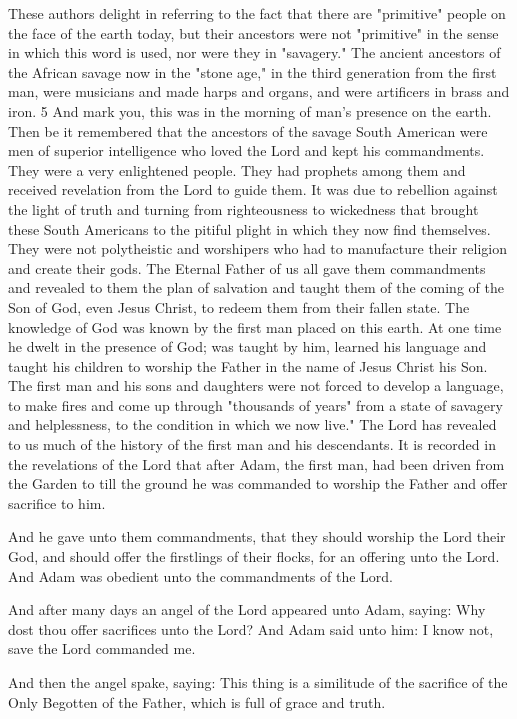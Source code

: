 These authors delight in referring to the fact that there are "primitive" people on the face of
the earth today, but their ancestors were not "primitive" in the sense in which this word is
used, nor were they in "savagery." The ancient ancestors of the African savage now in the
"stone age," in the third generation from the first man, were musicians and made harps and
organs, and were artificers in brass and iron. 5 And mark you, this was in the morning of
man's presence on the earth. Then be it remembered that the ancestors of the savage South
American were men of superior intelligence who loved the Lord and kept his
commandments. They were a very enlightened people. They had prophets among them and
received revelation from the Lord to guide them. It was due to rebellion against the light of
truth and turning from righteousness to wickedness that brought these South Americans to
the pitiful plight in which they now find themselves. They were not polytheistic and
worshipers who had to manufacture their religion and create their gods. The Eternal Father of
us all gave them commandments and revealed to them the plan of salvation and taught them
of the coming of the Son of God, even Jesus Christ, to redeem them from their fallen state.
The knowledge of God was known by the first man placed on this earth. At one time he
dwelt in the presence of God; was taught by him, learned his language and taught his
children to worship the Father in the name of Jesus Christ his Son. The first man and his sons
and daughters were not forced to develop a language, to make fires and come up through
"thousands of years" from a state of savagery and helplessness, to the condition in which we
now live." The Lord has revealed to us much of the history of the first man and his
descendants. It is recorded in the revelations of the Lord that after Adam, the first man, had
been driven from the Garden to till the ground he was commanded to worship the Father and
offer sacrifice to him.

And he gave unto them commandments, that they should worship the Lord their God, and
should offer the firstlings of their flocks, for an offering unto the Lord. And Adam was
obedient unto the commandments of the Lord.

And after many days an angel of the Lord appeared unto Adam, saying: Why dost thou offer
sacrifices unto the Lord? And Adam said unto him: I know not, save the Lord commanded
me.

And then the angel spake, saying: This thing is a similitude of the sacrifice of the Only
Begotten of the Father, which is full of grace and truth.

